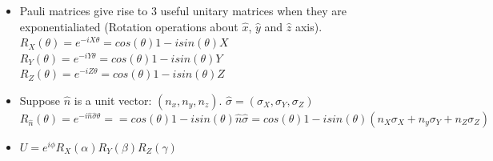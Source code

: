 \documentclass[11.5pt, paper=a4]{article}
\theoremstyle{definition}
\numberwithin{theorem}{section}
\begin{document}
\begin{itemize}
    \item Pauli matrices give rise to 3 useful unitary matrices when they are exponentialiated (Rotation operations about $\hat{x}$, $\hat{y}$ and $\hat{z}$ axis).\\
        $R_{X}(\theta) = e^{-iX\theta} = cos(\theta)1 - i sin(\theta) X$ \\
        $R_{Y}(\theta) = e^{-iY\theta} = cos(\theta)1 - i sin(\theta) Y$\\
        $R_{Z}(\theta) = e^{-iZ\theta} = cos(\theta)1 - i sin(\theta) Z$ \\
    \newpage    
    
    \item Suppose $\hat{n}$ is a unit vector: $(n_{x}, n_{y}, n_{z})$.   $\hat{\sigma} = (\sigma_{X}, \sigma_{Y}, \sigma_{Z})$\\
    $R_{\hat{n}}(\theta) = e^{-i\hat{n}\hat{\sigma}\theta} = = cos(\theta)1 - i sin(\theta) \hat{n} \hat{\sigma} = cos(\theta)1 - i sin(\theta)(n_{X}\sigma_{X} + n_{y}\sigma_{Y} + n_{Z}\sigma_{Z})$

    \item $U = e^{i\phi}R_{X}(\alpha)R_{Y}(\beta)R_{Z}(\gamma)$
    

\end{itemize}
\end{document}
